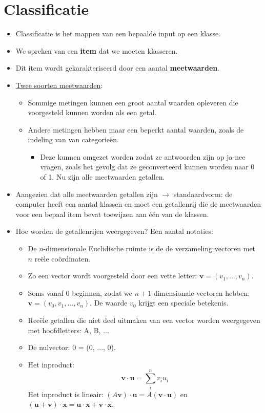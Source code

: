 \documentclass{report}
\begin{document}
\section{Classificatie}
\begin{itemize}
	\item Classificatie is het mappen van een bepaalde input op een klasse.
	\item We spreken van een \textbf{item} dat we moeten klasseren.
	\item Dit item wordt gekarakteriseerd door een aantal \textbf{meetwaarden}.
	\item \underline{Twee soorten meetwaarden}:
	\begin{itemize}
		\item Sommige metingen kunnen een groot aantal waarden opleveren die voorgesteld kunnen worden als een getal.
		\item Andere metingen hebben maar een beperkt aantal waarden, zoals de indeling van van categorieën. 
		\begin{itemize}
			\item Deze kunnen omgezet worden zodat ze antwoorden zijn op ja-nee vragen, zoals het gevolg dat ze geconverteerd kunnen worden naar 0 of 1.
			\good Nu zijn alle meetwaarden getallen.	
		\end{itemize}
	\end{itemize}
	\item Aangezien dat alle meetwaarden getallen zijn $\rightarrow$ standaardvorm: de computer heeft een aantal klassen en moet een getallenrij die de meetwaarden voor een bepaal item bevat toewijzen aan één van de klassen.
	\item Hoe worden de getallenrijen weergegeven? Een aantal notaties:
	\begin{itemize}
		\item De $n$-dimensionale Euclidische ruimte is de de verzameling vectoren met $n$ reële coördinaten.
		\item Zo een vector wordt voorgesteld door een vette letter: $\textbf{v} = (v_1, ..., v_n)$.
		\item Soms vanaf 0 beginnen, zodat we $n+1$-dimensionale vectoren hebben: $\textbf{v} = (v_0, v_1, ..., v_n)$. De waarde $v_0$ krijgt een speciale betekenis.
		\item Reeële getallen die niet deel uitmaken van een vector worden weergegeven met hoofdletters: A, B, ...
		\item De nulvector: 0 = (0, ..., 0).
		\item Het inproduct:
		$$\textbf{v}\cdot\textbf{u} = \sum_{i}^{n}v_iu_i$$
		Het inproduct is lineair: $(A\textbf{v})\cdot \textbf{u} = A(\textbf{v}\cdot\textbf{u})$ en $(\textbf{u} + \textbf{v})\cdot\textbf{x} = \textbf{u} \cdot \textbf{x} + \textbf{v} \cdot \textbf{x}$.
		

\end{itemize}
\end{itemize}
\end{document}
